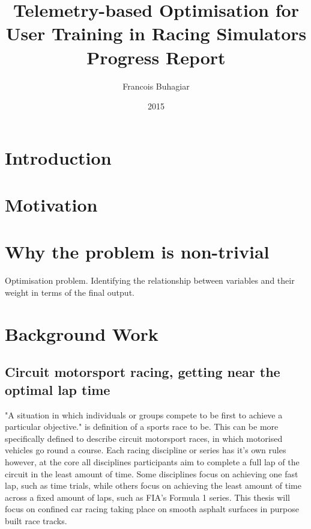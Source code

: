 \documentclass{article}
\title{Telemetry-based Optimisation for User Training in Racing Simulators \\ Progress Report}
\author{Francois Buhagiar}
\date{2015}
\begin{document}

\maketitle

\setcounter{page}{1}

\newpage
\begin{abstract}
\end{abstract}

\newpage
\section{Introduction}

\section{Motivation}

\section{Why the problem is non-trivial}

Optimisation problem.
Identifying the relationship between variables and their weight in terms of the final output.

\section{Background Work}

\subsection{Circuit motorsport racing, getting near the optimal lap time}

"A situation in which individuals or groups compete to be first to achieve a particular objective." is definition of a sports race to be. This can be more specifically defined to describe circuit motorsport races, in which motorised vehicles go round a course. Each racing discipline or series has it's own rules however, at the core all disciplines participants aim to complete a full lap of the circuit in the least amount of time. Some disciplines focus on achieving one fast lap, such as time trials, while others focus on achieving the least amount of time across a fixed amount of laps, such as FIA's Formula 1 series. This thesis will focus on confined car racing taking place on smooth asphalt surfaces in purpose built race tracks.
\end{document}
